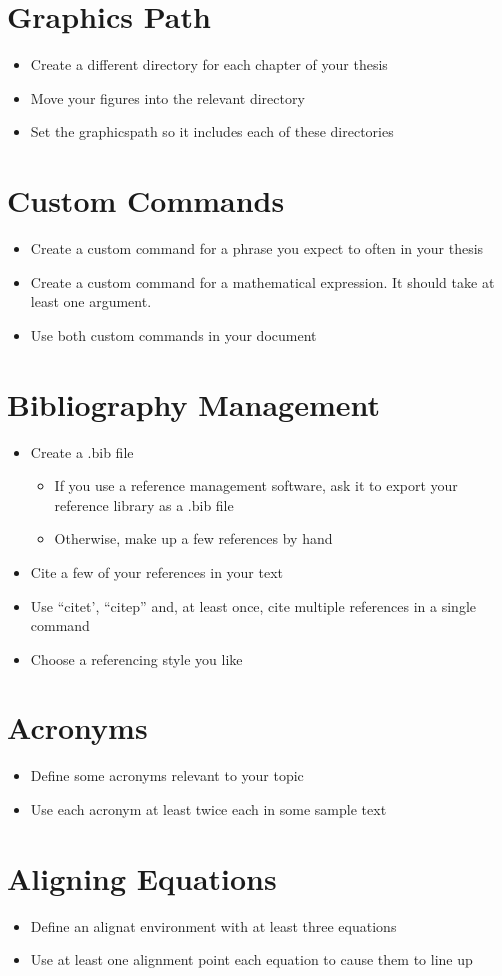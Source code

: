 \documentclass[11pt,a4paper]{article}
\begin{document}
\section{Graphics Path}
\begin{itemize}
\item Create a different directory for each chapter of your thesis
\item Move your figures into the relevant directory
\item Set the graphicspath so it includes each of these directories
\end{itemize}

\section{Custom Commands}
\begin{itemize}
\item Create a custom command for a phrase you expect to often in your thesis
\item Create a custom command for a mathematical expression. It should take at least one argument.
\item Use both custom commands in your document
\end{itemize}

\section{Bibliography Management}
\begin{itemize}
\item Create a .bib file
\begin{itemize}
\item If you use a reference management software, ask it to export your reference library as a .bib file
\item Otherwise, make up a few references by hand
\end{itemize}
\item Cite a few of your references in your text
\item Use ``citet', ``citep'' and, at least once,  cite multiple references in a single command
\item Choose a referencing style you like
\end{itemize}

\section{Acronyms}
\begin{itemize}
\item Define some acronyms relevant to your topic
\item Use each acronym at least twice each in some sample text
\end{itemize}

\section{Aligning Equations}
\begin{itemize}
\item Define an alignat environment with at least three equations
\item Use at least one alignment point each equation to cause them to line up
\end{itemize}
\end{document}
